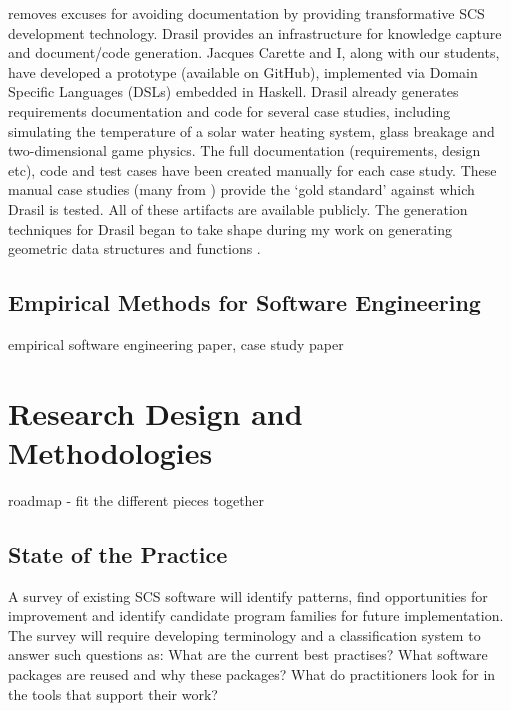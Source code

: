 \documentclass[12pt]{article}
\begin{document}
\citet{SzymczakEtAl2016} removes excuses for avoiding documentation by providing
transformative SCS development technology.  Drasil provides an infrastructure
for knowledge capture and document/code generation.  Jacques Carette and I,
along with our students, have developed a prototype (available on GitHub),
implemented via Domain Specific Languages (DSLs) embedded in Haskell.  Drasil
already generates requirements documentation and code for several case studies,
including simulating the temperature of a solar water heating system, glass
breakage and two-dimensional game physics.  The full documentation
(requirements, design etc), code and test cases have been created manually for
each case study.  These manual case studies (many from \citet{SmithJegatheesanAndKelly2016})
provide the `gold standard' against which Drasil is tested.  All of these
artifacts are available publicly.  The generation techniques for Drasil began to
take shape during my work on generating geometric data structures and functions
\citep{CaretteEtAl2011}.

\subsection{Empirical Methods for Software Engineering}

empirical software engineering paper, case study paper

\section{Research Design and Methodologies}

roadmap - fit the different pieces together

\subsection{State of the Practice}

A survey of existing SCS software will identify patterns, find opportunities for
improvement and identify candidate program families for future implementation.
The survey will require developing terminology and a classification system to
answer such questions as: What are the current best practises?  What software
packages are reused and why these packages?  What do practitioners look for in
the tools that support their work?
\end{document}
